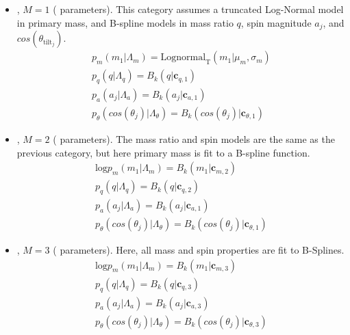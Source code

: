 \begin{itemize}
    \item \first{}, $M=1$ ( parameters). This category assumes a truncated Log-Normal model in primary mass, and B-spline models in mass ratio $q$, spin magnitude $a_j$, and $cos(\theta_{\text{tilt}_j})$. 
    \begin{eqnarray} \label{eq:lowmass}
        p_{m}(m_1| \Lambda_{m}) = \text{Lognormal}_\text{T}(m_1 | \mu_{m}, \sigma_{m}) \\
        p_{q}(q| \Lambda_{q}) = B_k(q | \mathbf{c}_{q,1}) \\
        p_{a}(a_j| \Lambda_{a}) = B_k(a_j | \mathbf{c}_{a,1}) \\
        p_{\theta}(cos(\theta_j)| \Lambda_{\theta}) = B_k( cos(\theta_j) | \mathbf{c}_{\theta,1})
    \end{eqnarray}

    \item \contA{}, $M=2$ ( parameters). The mass ratio and spin models are the same as the previous category, but here primary mass is fit to a B-spline function. 
    \begin{eqnarray} \label{eq:contmass}
        \text{log} p_{m}(m_1| \Lambda_{m}) = B_k(m_1 | \mathbf{c}_{m, 2}) \\
        p_{q}(q| \Lambda_{q}) = B_k(q | \mathbf{c}_{q,2}) \\
        p_{a}(a_j| \Lambda_{a}) = B_k(a_j | \mathbf{c}_{a,1}) \\
        p_{\theta}(cos(\theta_j)| \Lambda_{\theta}) = B_k( cos(\theta_j) | \mathbf{c}_{\theta,1})
    \end{eqnarray}
    
    \item \contB{}, $M=3$ ( parameters). Here, all mass and spin properties are fit to B-Splines.
    \begin{eqnarray} \label{eq:contmass}
        \text{log} p_{m}(m_1| \Lambda_{m}) = B_k(m_1 | \mathbf{c}_{m, 3}) \\
        p_{q}(q| \Lambda_{q}) = B_k(q | \mathbf{c}_{q,3}) \\
        p_{a}(a_j| \Lambda_{a}) = B_k(a_j | \mathbf{c}_{a,3}) \\
        p_{\theta}(cos(\theta_j)| \Lambda_{\theta}) = B_k( cos(\theta_j) | \mathbf{c}_{\theta,3})
    \end{eqnarray}
\end{itemize}